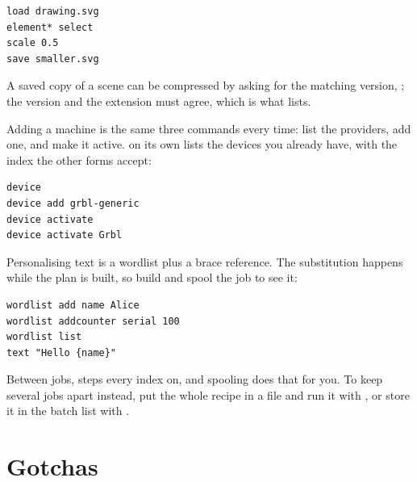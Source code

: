 \begin{lstlisting}[style=konsole]
load drawing.svg
element* select
scale 0.5
save smaller.svg
\end{lstlisting}

\noindent A saved copy of a scene can be compressed by asking for the matching
version, ; the version and the extension must
agree, which is what  lists.

Adding a machine is the same three commands every time: list the providers, add
one, and make it active.  on its own lists the devices you
already have, with the index the other forms accept:

\begin{lstlisting}[style=konsole]
device
device add grbl-generic
device activate
device activate Grbl
\end{lstlisting}

\noindent Personalising text is a wordlist plus a brace reference. The
substitution happens while the plan is built, so build and spool the job to see
it:

\begin{lstlisting}[style=konsole]
wordlist add name Alice
wordlist addcounter serial 100
wordlist list
text "Hello {name}"
\end{lstlisting}

\noindent Between jobs,  steps every index on, and spooling
does that for you. To keep several jobs apart instead, put the whole recipe in a
file and run it with , or store it in the batch list with
.

\section*{Gotchas}

